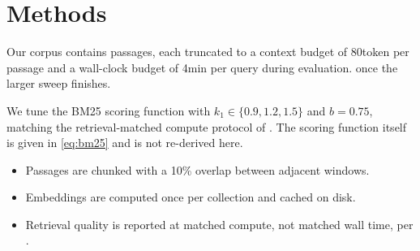 \section{Methods}

Our corpus contains \dsize{} passages, each truncated to a context budget of
\unit{80}{token} per passage and a wall-clock budget of \unit{4}{min} per
query during evaluation.  once the larger sweep
finishes.

We tune the BM25 scoring function with $k_1 \in \{0.9, 1.2, 1.5\}$ and
$b = 0.75$, matching the retrieval-matched compute protocol of
\citep[cf.][]{lindqvist2021}. The scoring function itself is given in
\eqref{eq:bm25} and is not re-derived here.

\begin{itemize}
\item Passages are chunked with a 10\% overlap between adjacent windows.
\item Embeddings are computed once per collection and cached on disk.
\item Retrieval quality is reported at matched compute, not matched wall
      time, per \citet{lindqvist2021}.
\end{itemize}

